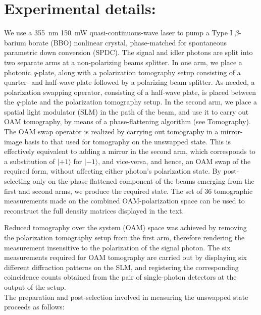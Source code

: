 \documentclass[12pt]{iopart}
\begin{document}
\section{Experimental details:}
%
 We use a 355~nm 150~mW quasi-continuous-wave laser to pump a Type I $\beta$-barium borate (BBO) nonlinear crystal, phase-matched for spontaneous parametric down conversion (SPDC). The signal and idler photons are split into two separate arms at a non-polarizing beams splitter. In one arm, we place a photonic \textit{q}-plate, along with a polarization tomography setup consisting of a quarter- and half-wave plate followed by a polarizing beam splitter. As needed, a polarization swapping operator, consisting of a half-wave plate, is placed between the \textit{q}-plate and the polarization tomography setup. In the second arm, we place a spatial light modulator (SLM) in the path of the beam, and use it to carry out OAM tomography, by means of a phase-flattening algorithm (see Tomography). The OAM swap operator is realized by carrying out tomography in a mirror-image basis to that used for tomography on the unswapped state. This is effectively equivalent to adding a mirror in the second arm, which corresponds to a substitution of $|+1\rangle$ for $|-1\rangle$, and vice-versa, and hence, an OAM swap of the required form, without affecting either photon's polarization state. By post-selecting only on the phase-flattened component of the beams emerging from the first and second arms, we produce the required state. The set of 36 tomographic measurements made on the combined OAM-polarization space can be used to reconstruct the full density matrices displayed in the text. 

Reduced tomography over the system (OAM) space was achieved by removing the polarization tomography setup from the first arm, therefore rendering the measurement insensitive to the polarization of the signal photon. The six measurements required for OAM tomography are carried out by displaying six different diffraction patterns on the SLM, and registering the corresponding coincidence counts obtained from the pair of single-photon detectors at the output of the setup. \\

\noindent The preparation and post-selection involved in measuring the unswapped state proceeds as follows: \\
\end{document}
